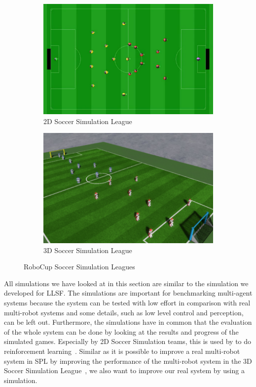 \begin{figure}
  \centering
  \begin{subfigure}[b]{0.48\textwidth}
    \includegraphics[width=\textwidth]{pics/soccer_sim_2d}
    \caption{2D Soccer Simulation League~\cite{soccer_simulation_2d_pic}}
    \label{fig:soccer_simulation_2d}
  \end{subfigure}
  \begin{subfigure}[b]{0.48\textwidth}
    \includegraphics[width=\textwidth]{pics/soccer_simulation_3d}
    \caption{3D Soccer Simulation League~\cite{soccer_simulation_low_level}}
    \label{fig:soccer_simulation_3d}
  \end{subfigure}
  \caption{RoboCup Soccer Simulation Leagues}
  \label{fig:soccer_simulation}
\end{figure}
All simulations we have looked at in this section are similar to the simulation we developed for LLSF. The simulations are important for benchmarking multi-agent systems because the system can be tested with low effort in comparison with real multi-robot systems and some details, such as low level control and perception, can be left out.  Furthermore, the simulations have in common that the evaluation of the whole system can be done by looking at the results and progress of the simulated games. Especially by 2D Soccer Simulation teams, this is used by to do reinforcement learning~\cite{simsoccer_reinforcement_1,simsoccer_reinforcement_2}. Similar as it is possible to improve a real multi-robot system in SPL by improving the performance of the multi-robot system in the 3D Soccer Simulation League~\cite{from_sim_to_real}, we also want to improve our real system by using a simulation.


